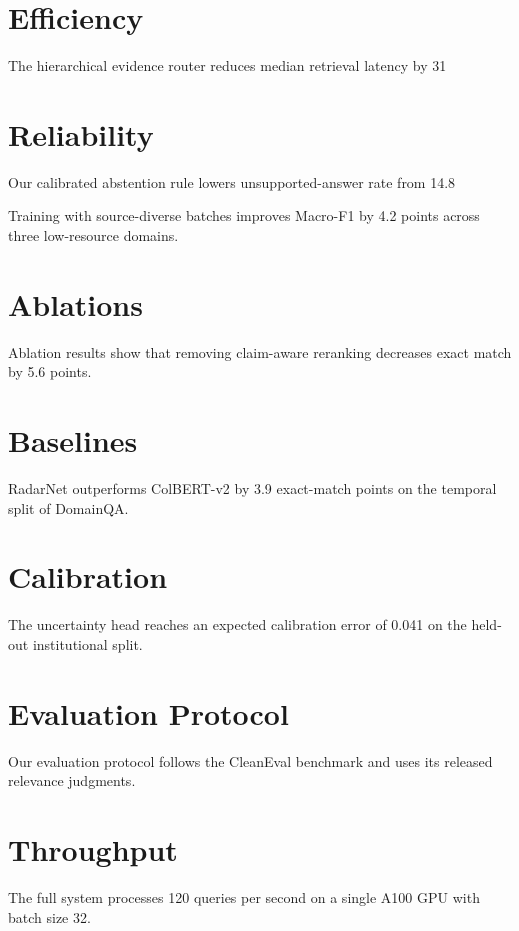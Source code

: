 \documentclass{article}
\begin{document}
\section{Efficiency}
The hierarchical evidence router reduces median retrieval latency by 31%

\section{Reliability}
Our calibrated abstention rule lowers unsupported-answer rate from 14.8%

Training with source-diverse batches improves Macro-F1 by 4.2 points across three low-resource domains.

\section{Ablations}
Ablation results show that removing claim-aware reranking decreases exact match by 5.6 points.

\section{Baselines}
RadarNet outperforms ColBERT-v2 by 3.9 exact-match points on the temporal split of DomainQA.

\section{Calibration}
The uncertainty head reaches an expected calibration error of 0.041 on the held-out institutional split.

\section{Evaluation Protocol}
Our evaluation protocol follows the CleanEval benchmark and uses its released relevance judgments.

\section{Throughput}
The full system processes 120 queries per second on a single A100 GPU with batch size 32.
\end{document}
